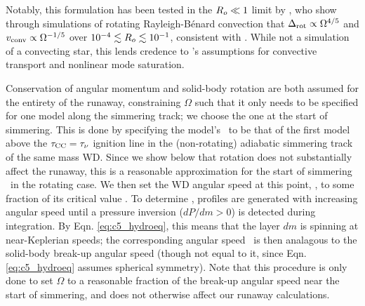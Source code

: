 


Notably, this formulation has been tested in the $\rossby \ll 1$ limit by \cite{barkdl14}, who show through simulations of rotating Rayleigh-B\'{e}nard convection that $\dnabrot \propto \Omega^{4/5}$ and $\vconv \propto \Omega^{-1/5}$ over $10^{-4} \lesssim \rossby \lesssim 10^{-1}$, consistent with \citeal{stev79}.  While not a simulation of a convecting star, this lends credence to \citeal{stev79}'s assumptions for convective transport and nonlinear mode saturation.

Conservation of angular momentum and solid-body rotation are both assumed for the entirety of the runaway, constraining $\Omega$ such that it only needs to be specified for one model along the simmering track; we choose the one at the start of simmering.  This is done by specifying the model's \Sc\ to be that of the first model above the $\taucc = \taunu$ ignition line in the (non-rotating) adiabatic simmering track of the same mass WD.  Since we show below that rotation does not substantially affect the runaway, this is a reasonable approximation for the start of simmering \Sc\ in the rotating case.  We then set the WD angular speed at this point, \Ominit, to some fraction of its critical value \Omcrit.  To determine \Omcrit, profiles are generated with increasing angular speed until a pressure inversion ($dP/dm > 0$) is detected during integration.  By Eqn. \ref{eq:c5_hydroeq}, this means that the layer $dm$ is spinning at near-Keplerian speeds; the corresponding angular speed \Omcrit\ is then analagous to the solid-body break-up angular speed (though not equal to it, since Eqn. \ref{eq:c5_hydroeq} assumes spherical symmetry).  Note that this procedure is only done to set $\Omega$ to a reasonable fraction of the break-up angular speed near the start of simmering, and does not otherwise affect our runaway calculations.

